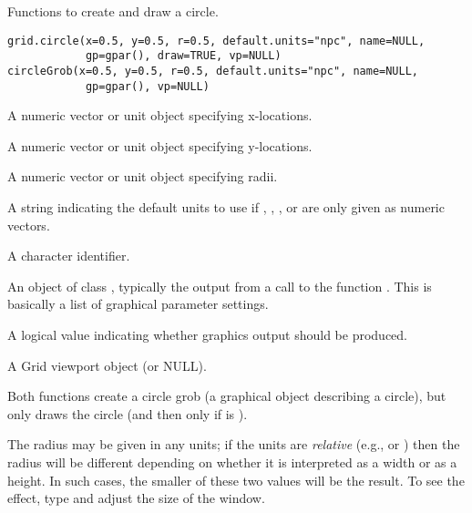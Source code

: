 %
\begin{Description}\relax
Functions to create and draw a circle.  
\end{Description}
%
\begin{Usage}
\begin{verbatim}
grid.circle(x=0.5, y=0.5, r=0.5, default.units="npc", name=NULL,
            gp=gpar(), draw=TRUE, vp=NULL)
circleGrob(x=0.5, y=0.5, r=0.5, default.units="npc", name=NULL,
            gp=gpar(), vp=NULL)
\end{verbatim}
\end{Usage}
%
\begin{Arguments}
\begin{ldescription}
\item[\code{x}] A numeric vector or unit object specifying x-locations.
\item[\code{y}] A numeric vector or unit object specifying y-locations.
\item[\code{r}] A numeric vector or unit object specifying radii.
\item[\code{default.units}] A string indicating the default units to use
if , , , or 
are only given as numeric vectors. 
\item[\code{name}]  A character identifier. 
\item[\code{gp}] An object of class , typically the output
from a call to the function .  This is basically
a list of graphical parameter settings.
\item[\code{draw}] A logical value indicating whether graphics output
should be produced.
\item[\code{vp}] A Grid viewport object (or NULL).
\end{ldescription}
\end{Arguments}
%
\begin{Details}\relax
Both functions create a circle grob (a graphical object describing a
circle), but only 
draws the circle (and then only if  is ).

The radius may be given in any
units;  if the units are \emph{relative} (e.g.,  or
) then the radius will be different depending on
whether it is interpreted as a width or as a height.  In such cases,
the smaller of these two values will be the result.  To see the
effect, type  and adjust the size of the window.
\end{Details}
